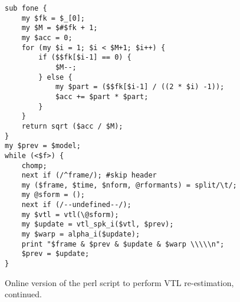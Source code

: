 \documentclass[11pt]{article}
\begin{document}
\begin{figure*}
\caption{Online version of the perl script to perform VTL re-estimation, continued.}
\label{app:rodriguezonline2}
\begin{small}
\begin{verbatim}
sub fone {
    my $fk = $_[0];
    my $M = $#$fk + 1;
    my $acc = 0;
    for (my $i = 1; $i < $M+1; $i++) {
        if ($$fk[$i-1] == 0) {
            $M--;
        } else {
            my $part = ($$fk[$i-1] / ((2 * $i) -1));
            $acc += $part * $part;
        }
    }
    return sqrt ($acc / $M);
}
my $prev = $model;
while (<$f>) {
    chomp;
    next if (/^frame/); #skip header
    my ($frame, $time, $nform, @rformants) = split/\t/;
    my @sform = ();
    next if (/--undefined--/);
    my $vtl = vtl(\@sform);
    my $update = vtl_spk_i($vtl, $prev);
    my $warp = alpha_i($update);
    print "$frame & $prev & $update & $warp \\\\\n";
    $prev = $update;
}
\end{verbatim}
\end{small}
\end{figure*}
\end{document}
